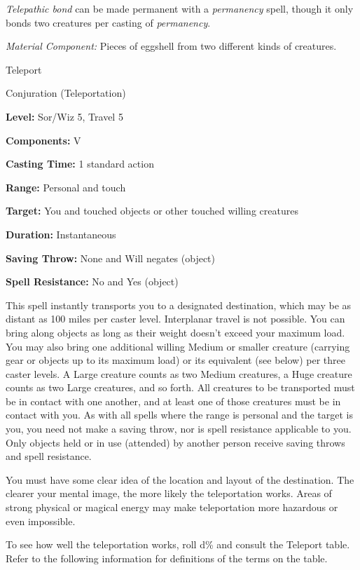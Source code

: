 \documentclass{article}
\begin{document}
\textit{Telepathic bond }can be made permanent with a \textit{permanency }spell, 
though it only bonds two creatures per casting of \textit{permanency}.

\textit{Material Component: }Pieces of eggshell from two different kinds of creatures.

\vspace{12pt}
Teleport

Conjuration (Teleportation)

\textbf{Level:} Sor/Wiz 5, Travel 5

\textbf{Components:} V

\textbf{Casting Time:} 1 standard action

\textbf{Range:} Personal and touch

\textbf{Target:} You and touched objects or other touched willing creatures

\textbf{Duration:} Instantaneous

\textbf{Saving Throw:} None and Will negates (object)

\textbf{Spell Resistance:} No and Yes (object)

This spell instantly transports you to a designated destination, which may be as 
distant as 100 miles per caster level. Interplanar travel is not possible. You 
can bring along objects as long as their weight doesn't exceed your maximum load. 
You may also bring one additional willing Medium or smaller creature (carrying 
gear or objects up to its maximum load) or its equivalent (see below) per three 
caster levels. A Large creature counts as two Medium creatures, a Huge creature 
counts as two Large creatures, and so forth. All creatures to be transported must 
be in contact with one another, and at least one of those creatures must be in 
contact with you. As with all spells where the range is personal and the target 
is you, you need not make a saving throw, nor is spell resistance applicable to 
you. Only objects held or in use (attended) by another person receive saving throws 
and spell resistance.

You must have some clear idea of the location and layout of the destination. The 
clearer your mental image, the more likely the teleportation works. Areas of strong 
physical or magical energy may make teleportation more hazardous or even impossible.

To see how well the teleportation works, roll d\% and consult the Teleport table. 
Refer to the following information for definitions of the terms on the table.
\end{document}
